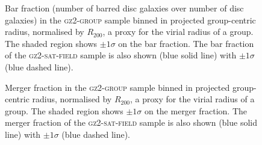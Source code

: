 \begin{figure}
\caption[Bar fraction with group radius in the \textsc{gz2-group} sample]{Bar fraction (number of barred disc galaxies over number of disc galaxies) in the \textsc{gz2-group} sample binned in projected group-centric radius, normalised by $R_{200}$, a proxy for the virial radius of a group. The shaded region shows $\pm1\sigma$ on the bar fraction. The bar fraction of the \textsc{gz2-sat-field} sample is also shown (blue solid line) with $\pm1\sigma$ (blue dashed line).}
\label{fig:barradius}
\end{figure}

\begin{figure}
\caption[Merger fraction with group radius in the \textsc{gz2-group} sample]{Merger fraction in the \textsc{gz2-group} sample binned in projected group-centric radius, normalised by $R_{200}$, a proxy for the virial radius of a group. The shaded region shows $\pm1\sigma$ on the merger fraction. The merger fraction of the \textsc{gz2-sat-field} sample is also shown (blue solid line) with $\pm1\sigma$ (blue dashed line).}
\label{fig:mergerradius}
\end{figure}


